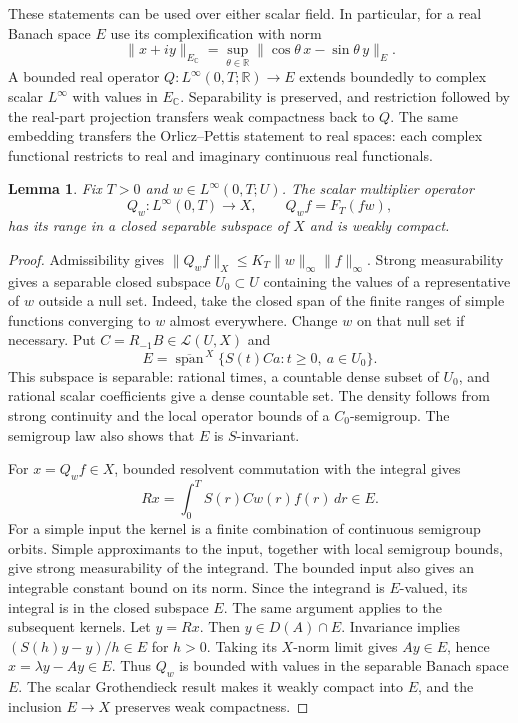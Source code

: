 \documentclass[11pt]{article}
\newtheorem{lemma}[theorem]{Lemma}
\theoremstyle{remark}
\newcommand{\Lin}{\mathcal L}
\newcommand{\R}{\mathbb R}
\newcommand{\C}{\mathbb C}
\begin{document}
These statements can be used over either scalar field. In particular,
for a real Banach space \(E\) use its complexification with norm
\[
 \|x+iy\|_{E_\C}
   =\sup_{\theta\in\R}\|\cos\theta\,x-\sin\theta\,y\|_E .
\]
A bounded real operator \(Q:L^\infty(0,T;\R)\to E\) extends boundedly
to complex scalar \(L^\infty\) with values in \(E_\C\).
Separability is preserved, and restriction followed by the real-part
projection transfers weak compactness back to \(Q\).
The same embedding transfers the Orlicz--Pettis statement to real
spaces: each complex functional restricts to real and imaginary
continuous real functionals.

\begin{lemma}\label{lem:range}
Fix \(T>0\) and \(w\in L^\infty(0,T;U)\). The scalar multiplier operator
\[
 Q_w:L^\infty(0,T)\to X,\qquad Q_wf=F_T(fw),
\]
has its range in a closed separable subspace of \(X\) and is weakly compact.
\end{lemma}

\begin{proof}
Admissibility gives
\(\|Q_wf\|_X\le K_T\|w\|_\infty\|f\|_\infty\).
Strong measurability gives a separable closed subspace \(U_0\subset U\)
containing the values of a representative of \(w\) outside a null set.
Indeed, take the closed span of the finite ranges of simple functions
converging to \(w\) almost everywhere. Change \(w\) on that null set if
necessary. Put \(C=R_{-1}B\in\Lin(U,X)\) and
\[
 E=\overline{\operatorname{span}}^{\,X}
       \{S(t)Ca:t\ge0,\ a\in U_0\}.
\]
This subspace is separable: rational times, a countable dense subset of
\(U_0\), and rational scalar coefficients give a dense countable set.
The density follows from strong continuity and the local operator bounds
of a \(C_0\)-semigroup. The semigroup law also shows that \(E\) is
\(S\)-invariant.

For \(x=Q_wf\in X\), bounded resolvent commutation with the integral gives
\begin{equation}\label{eq:resolvent}
 Rx=\int_0^T S(r)Cw(r)f(r)\,dr\in E .
\end{equation}
For a simple input the kernel is a finite combination of continuous
semigroup orbits. Simple approximants to the input, together with local
semigroup bounds, give strong measurability of the integrand.
The bounded input also gives an integrable constant bound on its norm.
Since the integrand is \(E\)-valued, its integral is in the closed subspace
\(E\). The same argument applies to the subsequent kernels.
Let \(y=Rx\). Then \(y\in D(A)\cap E\). Invariance implies
\((S(h)y-y)/h\in E\) for \(h>0\). Taking its \(X\)-norm limit gives
\(Ay\in E\), hence \(x=\lambda y-Ay\in E\).
Thus \(Q_w\) is bounded with values in the separable Banach space \(E\).
The scalar Grothendieck result makes it weakly compact into \(E\), and
the inclusion \(E\to X\) preserves weak compactness.
\end{proof}
\end{document}
